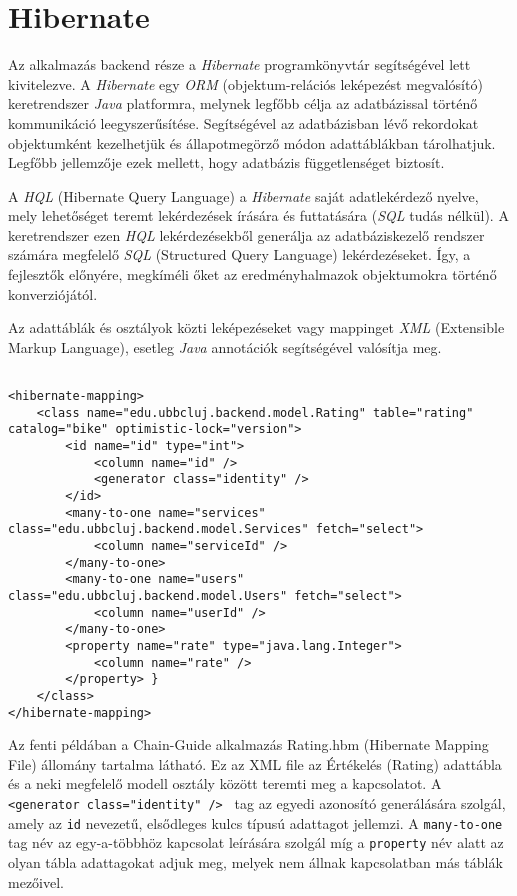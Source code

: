 %
\section{Hibernate}\label{sec:FELH:hi}

\par Az alkalmazás backend része a \textit{Hibernate} programkönyvtár segítségével lett kivitelezve. A \textit{Hibernate} egy \textit{ORM} (objektum-relációs leképezést megvalósító) keretrendszer \textit{Java} platformra, melynek legfőbb célja az adatbázissal történő kommunikáció leegyszerűsítése. Segítségével az adatbázisban lévő rekordokat objektumként kezelhetjük és állapotmegörző módon adattáblákban tárolhatjuk. Legfőbb jellemzője ezek mellett, hogy adatbázis függetlenséget biztosít.
\par A \textit{HQL} (Hibernate Query Language) a \textit{Hibernate} saját adatlekérdező nyelve, mely lehetőséget teremt lekérdezések írására és futtatására (\textit{SQL} tudás nélkül). A keretrendszer ezen \textit{HQL} lekérdezésekből generálja az adatbáziskezelő rendszer számára megfelelő \textit{SQL} (Structured Query Language) lekérdezéseket. Így, a fejlesztők előnyére, megkíméli őket az eredményhalmazok objektumokra történő konverziójától.
\par Az adattáblák és osztályok közti leképezéseket vagy mappinget \textit{XML} (Extensible Markup Language), esetleg \textit{Java} annotációk segítségével valósítja meg. 


\lstset{language=XML}
\begin{lstlisting}

<hibernate-mapping>
    <class name="edu.ubbcluj.backend.model.Rating" table="rating" catalog="bike" optimistic-lock="version">
        <id name="id" type="int">
            <column name="id" />
            <generator class="identity" />
        </id>
        <many-to-one name="services" class="edu.ubbcluj.backend.model.Services" fetch="select">
            <column name="serviceId" />
        </many-to-one>
        <many-to-one name="users" class="edu.ubbcluj.backend.model.Users" fetch="select">
            <column name="userId" />
        </many-to-one>
        <property name="rate" type="java.lang.Integer">
            <column name="rate" />
        </property> }
    </class>
</hibernate-mapping>
\end{lstlisting}

\par 
Az fenti példában a Chain-Guide alkalmazás Rating.hbm (Hibernate Mapping File) állomány tartalma látható. Ez az XML file az Értékelés (Rating) adattábla és a neki megfelelő modell osztály között teremti meg a kapcsolatot. A {\tt <generator class="identity" /> } tag az egyedi azonosító generálására szolgál, amely az {\tt id} nevezetű, elsődleges kulcs típusú adattagot jellemzi. A {\tt many-to-one} tag név az egy-a-többhöz kapcsolat leírására szolgál míg a {\tt  property} név alatt az olyan tábla adattagokat adjuk meg, melyek nem állnak kapcsolatban más táblák mezőivel.


